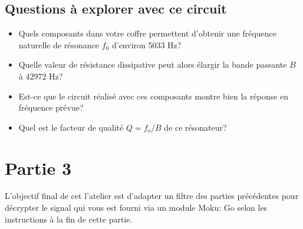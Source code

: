 \documentclass[canadien,12pt,oneside,letterpaper]{article}
\begin{document}
\subsection{Questions à explorer avec ce circuit}
\begin{itemize}
    \item Quels composants dans votre coffre permettent d'obtenir une fréquence naturelle de résonance $f_0$ d'environ 5033 Hz? %
    \item Quelle valeur de résistance dissipative peut alors élargir la bande passante $B$ à 42972 Hz? %
    \item Est-ce que le circuit réalisé avec ces composants montre bien la réponse en fréquence prévue? %
    \item Quel est le facteur de qualité $Q=f_o/B$ de ce résonateur? %
\end{itemize}

\section{Partie 3}\label{sec:filtrage-source}
 L'objectif final de cet l'atelier est d'adapter un filtre des parties précédentes pour décrypter le signal qui vous est fourni via un module Moku: Go selon les instructions à la fin de cette partie.
\end{document}
